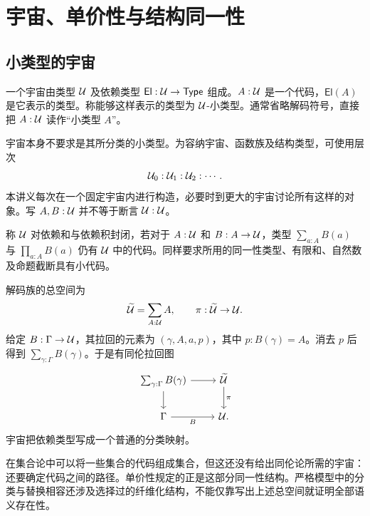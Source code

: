 \chapter{宇宙、单价性与结构同一性}
\section{小类型的宇宙}
\begin{definition}[宇宙与解码]
一个宇宙由类型 $\mathcal U$ 及依赖类型 $\mathsf{El}:\mathcal U\to\mathsf{Type}$ 组成。$A:\mathcal U$ 是一个代码，$\mathsf{El}(A)$ 是它表示的类型。称能够这样表示的类型为 $\mathcal U$-小类型。通常省略解码符号，直接把 $A:\mathcal U$ 读作“小类型 $A$”。
\end{definition}
\begin{remark}
宇宙本身不要求是其所分类的小类型。为容纳宇宙、函数族及结构类型，可使用层次
\[
\mathcal U_0:\mathcal U_1:\mathcal U_2:\cdots.
\]
本讲义每次在一个固定宇宙内进行构造，必要时到更大的宇宙讨论所有这样的对象。写 $A,B:\mathcal U$ 并不等于断言 $\mathcal U:\mathcal U$。
\end{remark}
\begin{definition}[宇宙对类型构造的封闭性]
称 $\mathcal U$ 对依赖和与依赖积封闭，若对于 $A:\mathcal U$ 和 $B:A\to\mathcal U$，类型 $\sum_{a:A}B(a)$ 与 $\prod_{a:A}B(a)$ 仍有 $\mathcal U$ 中的代码。同样要求所用的同一性类型、有限和、自然数及命题截断具有小代码。
\end{definition}
\begin{example}[普遍族]
解码族的总空间为
\[
\widetilde{\mathcal U}=\sum_{A:\mathcal U}A,
\qquad \pi:\widetilde{\mathcal U}\to\mathcal U.
\]
给定 $B:\Gamma\to\mathcal U$，其拉回的元素为 $(\gamma,A,a,p)$，其中 $p:B(\gamma)=A$。消去 $p$ 后得到 $\sum_{\gamma:\Gamma}B(\gamma)$。于是有同伦拉回图
\[
\begin{tikzcd}
\sum_{\gamma:\Gamma}B(\gamma)\ar[r]\ar[d]&\widetilde\U\ar[d,"\pi"]\\
\Gamma\ar[r,"B"']&\U.
\end{tikzcd}
\]
宇宙把依赖类型写成一个普通的分类映射。
\end{example}
\begin{remark}
在集合论中可以将一些集合的代码组成集合，但这还没有给出同伦论所需的宇宙：还要确定代码之间的路径。单价性规定的正是这部分同一性结构。严格模型中的分类与替换相容还涉及选择过的纤维化结构，不能仅靠写出上述总空间就证明全部语义存在性。
\end{remark}

